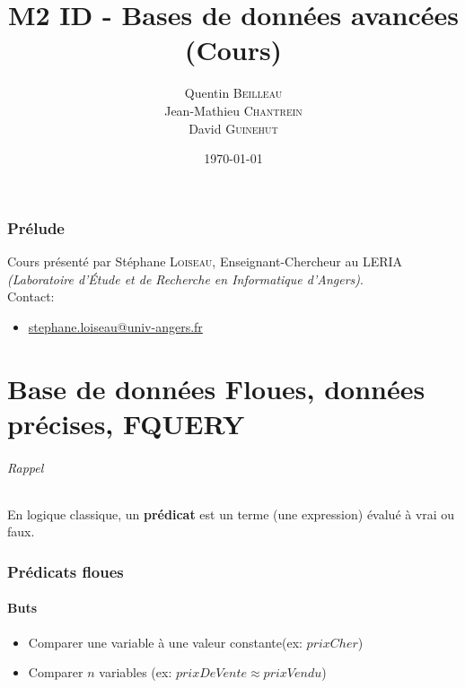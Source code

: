 \documentclass[a4paper,11pt]{article}
\title{M2 ID - Bases de données avancées \\ \normalsize (Cours)}
\author{Quentin \textsc{Beilleau} \\ Jean-Mathieu \textsc{Chantrein} \\ David \textsc{Guinehut}}
\date{\today}
\begin{document}
	\renewcommand{\headrulewidth}{0.001pt}
	
	\pagestyle{fancy}
	
	\maketitle

	\tableofcontents

\section*{Prélude}
Cours présenté par Stéphane \textsc{Loiseau}, Enseignant-Chercheur au LERIA \emph{(Laboratoire d’Étude et de Recherche en Informatique d'Angers)}.\\

Contact:
	\begin{itemize}
		\item[] \url{stephane.loiseau@univ-angers.fr} 
	\end{itemize}

\newpage
\part{Base de données Floues, données précises, FQUERY}

\paragraph {Rappel}
En logique classique, un \textbf{prédicat} est un terme (une expression) évalué à vrai ou faux.

\section{Prédicats floues}

\subsection{Buts}
\begin{itemize}
\item Comparer une variable à une valeur constante(ex: $prixCher$)
\item Comparer $n$ variables (ex: $prixDeVente \approx prixVendu$)
\end{itemize}
\end{document}
